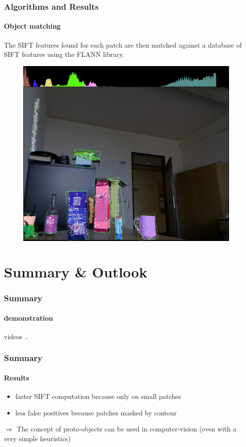 \documentclass[]{beamer}
\begin{document}
\begin{frame}
    \frametitle{Algorithms and Results}
    \framesubtitle{Object matching}
    
    The SIFT features found for each patch are then matched against a database of SIFT features using the FLANN library.
    \begin{figure}[h]
        \centering
            \includegraphics[height=0.6\textheight]{../images/contours_keypoints.jpg}
    \end{figure}
\end{frame}


\section{Summary \& Outlook} %
\label{sg:sec:outlook}

\begin{frame}
    \frametitle{Summary}
    \framesubtitle{demonstration}
    
    videos ..
    
\end{frame}

\begin{frame}
    \frametitle{Summary}
    \framesubtitle{Results}
    
    \begin{itemize}
        \item<+-> faster SIFT computation because only on small patches
        \item<+-> less false positives because patches masked by contour
    \end{itemize}
    
    \vspace{1cm}
    $\Rightarrow$ The concept of proto-objects can be used in computer-vision (even with a very simple heuristics)
    
\end{frame}
\end{document}
